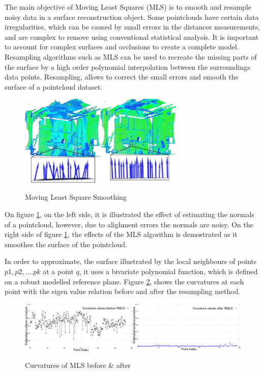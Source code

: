 \documentclass[12pt]{report}
\begin{document}
The main objective of Moving Least Squares (MLS) is to smooth and resample noisy data in a surface reconstruction object.
Some pointclouds have certain data irregularities, which can be caused by small errors in the distances measurements, and are complex to remove using conventional
statistical analysis. It is important to account for complex surfaces and occlusions to create a complete model. Resampling algorithms such as MLS can be used to 
recreate the missing parts of the surface  by a high order polynomial interpolation between the surroundings data points.
Resampling, allows to correct the small errors and smooth the surface of a pointcloud dataset. 

\begin{figure}[H]%
  \centering
  \includegraphics[width=0.7\textwidth]{resampling_1.jpg}
 \caption{Moving Least Square Smoothing}\cite[]{Rusu_ICRA2011_PCL}
 \label{fig:smoothing_mls} 
\end{figure}

On figure \ref{fig:smoothing_mls}, on the left side, it is illustrated the effect of estimating the normals of a pointcloud, however, due to alighment errors
the normals are noisy. On the right side of figure \ref{fig:smoothing_mls}, the effects of the MLS algorithm is demostrated as it smoothes the surface of the pointcloud.

In order to approximate, the surface illustrated by the local neighbours of points $p1,p2,....pk$ at a point $q$, it uses a bivariate polynomial function, which is defined on a robust modelled reference plane.
Figure \ref{fig:smoothing_curvature}, shows the curvatures at each point with the eigen value relation before and after the resampling method. 

\begin{figure}[H]%
  \centering
  \includegraphics[width=1\textwidth]{resampling_2.jpg}
 \caption{Curvatures of MLS before \& after}\cite[]{Rusu_ICRA2011_PCL}
 \label{fig:smoothing_curvature} 
\end{figure}
\end{document}
